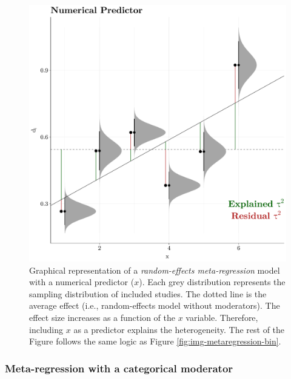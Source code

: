 \documentclass[
  man,floatsintext]{apa6}
\begin{document}
\begin{figure}[H]

{\centering \includegraphics[width=0.8\linewidth]{paper_files/figure-latex/img-metaregression-num-1} 

}

\caption{Graphical representation of a \emph{random-effects meta-regression} model with a numerical predictor (\(x\)). Each grey distribution represents the sampling distribution of included studies. The dotted line is the average effect (i.e., random-effects model without moderators). The effect size increases as a function of the \(x\) variable. Therefore, including \(x\) as a predictor explains the
heterogeneity. The rest of the Figure follows the same logic as Figure \ref{fig:img-metaregression-bin}.}\label{fig:img-metaregression-num}
\end{figure}

\normalsize

\hypertarget{meta-regression-with-a-categorical-moderator}{%
\subsubsection{Meta-regression with a categorical moderator}\label{meta-regression-with-a-categorical-moderator}}
\end{document}
